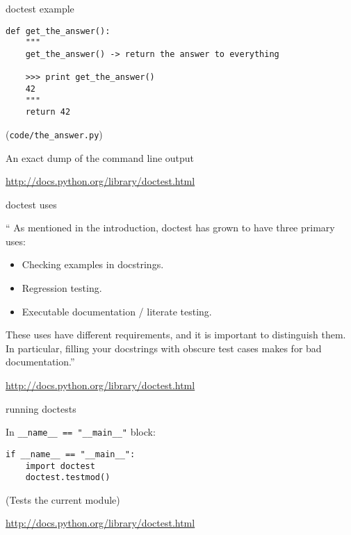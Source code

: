 \documentclass{beamer}
\begin{document}
\begin{frame}[fragile]{doctest example}


\begin{verbatim}
def get_the_answer():
    """
    get_the_answer() -> return the answer to everything
    
    >>> print get_the_answer()
    42
    """
    return 42
\end{verbatim}

(\verb|code/the_answer.py|)

\vfill
{\Large An exact dump of the command line output}

\vfill
\url{http://docs.python.org/library/doctest.html}
\end{frame} 

\begin{frame}[fragile]{doctest uses}

{\large
``
As mentioned in the introduction, doctest has grown to have three primary uses:

\begin{itemize}
    \item Checking examples in docstrings.
    \item Regression testing.
    \item Executable documentation / literate testing.
\end{itemize}

These uses have different requirements, and it is important to distinguish them.
In particular, filling your docstrings with obscure test cases makes for bad
documentation.''
}

\vfill
\url{http://docs.python.org/library/doctest.html}
\end{frame} 

\begin{frame}[fragile]{running doctests}

{\Large In \verb|__name__ == "__main__"| block:}

\vfill
\begin{verbatim}
if __name__ == "__main__":
    import doctest
    doctest.testmod()
\end{verbatim}

\vfill
{\large (Tests the current module) }


\vfill
\url{http://docs.python.org/library/doctest.html}

\end{frame} 
\end{document}
